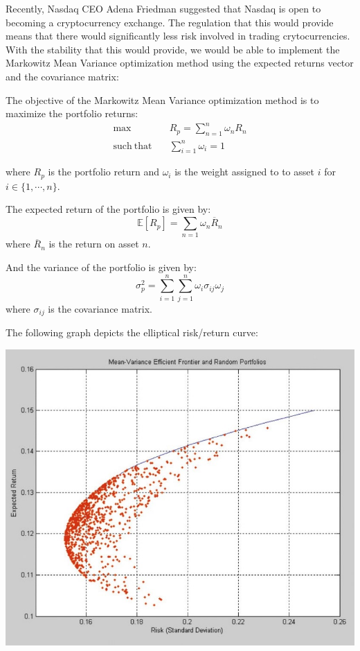 \documentclass[12pt, letterpaper]{article}
\begin{document}
	Recently, Nasdaq CEO Adena Friedman suggested that Nasdaq is open to becoming a cryptocurrency exchange. The regulation that this would provide means that there would significantly less risk involved in trading crytocurrencies. With the stability that this would provide, we would be able to implement the Markowitz Mean Variance optimization method using the expected returns vector and the covariance matrix:
	
	\begin{addmargin}[2em]{2em}
		The objective of the Markowitz Mean Variance optimization method is to maximize the portfolio returns:
		\begin{align*}
			\mathrm{max}& \quad R_p = \sum_{n=1}^n\omega_nR_n \\
			\mathrm{such\:that}& \quad \sum_{i=1}^n\omega_i=1
		\end{align*}
		
		where $R_p$ is the portfolio return and $\omega_i$ is the weight assigned to to asset $i$ for $i\in\{1,\cdots,n\}$.
	
		The expected return of the portfolio is given by: $$\mathbb{E}[R_p]=\sum_{n=1}\omega_n\overline{R}_n$$ where $\overline{R}_n$ is the return on asset $n$.
		
		And the variance of the portfolio is given by: $$\sigma^2_p=\sum_{i=1}^n\sum_{j=1}^n\omega_i\sigma_{ij}\omega_j$$ where $\sigma_{ij}$ is the covariance matrix.
			
			The following graph depicts the elliptical risk/return curve:
		\begin{center}
			\includegraphics[scale=.5]{risk_management.jpg}
		\end{center}
	\end{addmargin}
\end{document}
